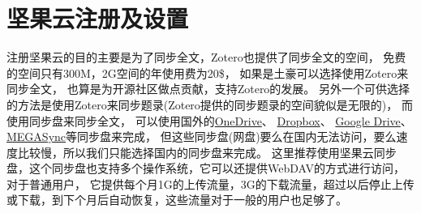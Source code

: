 \documentclass[cn,11pt,chinese]{elegantbook}
\begin{document}
		\section{坚果云注册及设置}\label{sec:jianguoReg}
		注册坚果云的目的主要是为了同步全文，Zotero也提供了同步全文的空间，
		免费的空间只有300M，2G空间的年使用费为20\$，
		如果是土豪可以选择使用Zotero来同步全文，
		也算是为开源社区做点贡献，支持Zotero的发展。
		另外一个可供选择的方法是使用Zotero来同步题录(Zotero提供的同步题录的空间貌似是无限的)，
		而使用同步盘来同步全文，
		可以使用国外的\href{https://office.live.com/start/OneDrive.aspx}{OneDrive}、
		\href{https://www.dropbox.com/}{Dropbox}、
		\href{https://www.google.com/drive/}{Google Drive}、\href{https://mega.nz/}{MEGASync}等同步盘来完成，
		但这些同步盘(网盘)要么在国内无法访问，要么速度比较慢，所以我们只能选择国内的同步盘来完成。 
		这里推荐使用坚果云同步盘，这个同步盘也支持多个操作系统，它可以还提供WebDAV的方式进行访问，对于普通用户，
		它提供每个月1G的上传流量，3G的下载流量，超过以后停止上传或下载，到下个月后自动恢复，这些流量对于一般的用户也足够了。
\end{document}
